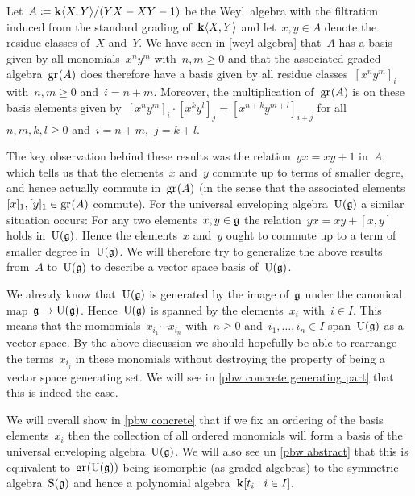 \begin{fluff}
  Let~$A \coloneqq \mathbf{k}\langle X,Y\rangle/(YX - XY - 1)$ be the Weyl~algebra with the filtration induced from the standard grading of~$\mathbf{k}\langle X,Y\rangle$ and let~$x, y \in A$ denote the residue classes of~$X$ and~$Y$.
  We have seen in \cref{weyl algebra} that~$A$ has a basis given by all monomials~$x^n y^m$ with~$n, m \geq 0$ and that the associated graded algebra~$\gr(A)$ does therefore have a basis given by all residue classes~$[x^n y^m]_i$ with~$n, m \geq 0$ and~$i = n+m$.
  Moreover, the multiplication of~$\gr(A)$ is on these basis elements given by~$[x^n y^m]_i \cdot [x^k y^l]_j = [x^{n+k} y^{m+l}]_{i+j}$ for all~$n, m, k, l \geq 0$ and~$i = n+m$,~$j = k+l$. 
  
  The key observation behind these results was the relation~$yx = xy + 1$ in~$A$, which tells us that the elements~$x$ and~$y$ commute up to terms of smaller degre, and hence actually commute in~$\gr(A)$ (in the sense that the associated elements~$[x]_1, [y]_1 \in \gr(A)$ commute).
  For the universal enveloping algebra~$\operatorname{U}(\mathfrak{g})$ a similar situation occurs:
  For any two elements~$x, y \in \mathfrak{g}$ the relation~$yx = xy + [x,y]$ holds in~$\operatorname{U}(\mathfrak{g})$.
  Hence the elements~$x$ and~$y$ ought to commute up to a term of smaller degree in~$\operatorname{U}(\mathfrak{g})$.
  We will therefore try to generalize the above results from~$A$ to~$\operatorname{U}(\mathfrak{g})$ to describe a vector space basis of~$\operatorname{U}(\mathfrak{g})$.
  
  We already know that~$\operatorname{U}(\mathfrak{g})$ is generated by the image of~$\mathfrak{g}$ under the canonical map~$\mathfrak{g} \to \operatorname{U}(\mathfrak{g})$.
  Hence~$\operatorname{U}(\mathfrak{g})$ is spanned by the elements~$x_i$ with~$i \in I$.
  This means that the momomials~$x_{i_1} \dotsm x_{i_n}$ with~$n \geq 0$ and~$i_1, \dotsc, i_n \in I$ span~$\operatorname{U}(\mathfrak{g})$ as a vector space.
  By the above discussion we should hopefully be able to rearrange the terms~$x_{i_j}$ in these monomials without destroying the property of being a vector space generating set.
  We will see in \cref{pbw concrete generating part} that this is indeed the case.
  
  We will overall show in \cref{pbw concrete} that if we fix an ordering of the basis elements~$x_i$ then the collection of all ordered monomials will form a basis of the universal enveloping algebra~$\operatorname{U}(\mathfrak{g})$.
  We will also see un \cref{pbw abstract} that this is equivalent to~$\gr(\Univ(\glie))$ being isomorphic (as graded algebras) to the symmetric algebra~$\operatorname{S}(\mathfrak{g})$ and hence a polynomial algebra~$\kf[t_i \suchthat i \in I]$.
\end{fluff}


